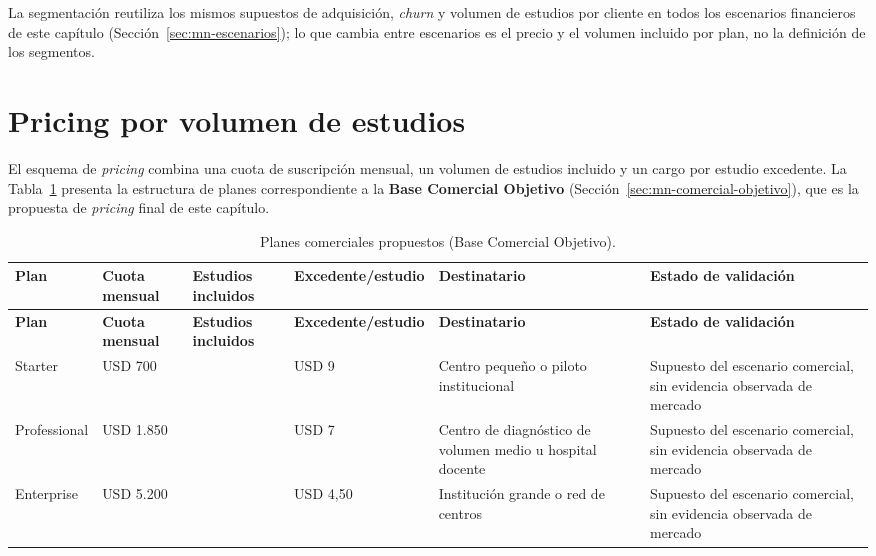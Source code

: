 La segmentación reutiliza los mismos supuestos de adquisición, \textit{churn} y volumen de estudios por cliente en todos los escenarios financieros de este capítulo (Sección~\ref{sec:mn-escenarios}); lo que cambia entre escenarios es el precio y el volumen incluido por plan, no la definición de los segmentos.

\section{Pricing por volumen de estudios}
\label{sec:mn-pricing}

El esquema de \textit{pricing} combina una cuota de suscripción mensual, un volumen de estudios incluido y un cargo por estudio excedente. La Tabla~\ref{tab:mn-planes} presenta la estructura de planes correspondiente a la \textbf{Base Comercial Objetivo} (Sección~\ref{sec:mn-comercial-objetivo}), que es la propuesta de \textit{pricing} final de este capítulo.

{\scriptsize
\setlength{\LTleft}{0pt}
\setlength{\LTright}{0pt}
\setlength{\tabcolsep}{3pt}
\renewcommand{\arraystretch}{1.18}
\begin{longtable}{>{\raggedright\arraybackslash}p{} >{\raggedright\arraybackslash}p{} >{\raggedright\arraybackslash}p{} >{\raggedright\arraybackslash}p{} >{\raggedright\arraybackslash}p{} >{\raggedright\arraybackslash}p{}}
\caption{Planes comerciales propuestos (Base Comercial Objetivo).}\label{tab:mn-planes}\\
\hline
\textbf{Plan} & \textbf{Cuota mensual} & \textbf{Estudios incluidos} & \textbf{Excedente/estudio} & \textbf{Destinatario} & \textbf{Estado de validación} \\
\hline
\endfirsthead
\hline
\textbf{Plan} & \textbf{Cuota mensual} & \textbf{Estudios incluidos} & \textbf{Excedente/estudio} & \textbf{Destinatario} & \textbf{Estado de validación} \\
\hline
\endhead
\hline
\endfoot
Starter & USD 700 & 120 & USD 9 & Centro pequeño o piloto institucional & Supuesto del escenario comercial, sin evidencia observada de mercado \\
Professional & USD 1.850 & 500 & USD 7 & Centro de diagnóstico de volumen medio u hospital docente & Supuesto del escenario comercial, sin evidencia observada de mercado \\
Enterprise & USD 5.200 & 1.500 & USD 4,50 & Institución grande o red de centros & Supuesto del escenario comercial, sin evidencia observada de mercado \\
\hline
\end{longtable}
}


